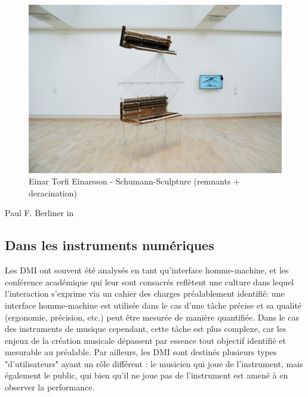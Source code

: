 \begin{figure}[!htbp]
	\includegraphics[width=\textwidth]{gfx/Einarson-SchumannSculpture}
	\caption{Einar Torfi Einarsson - Schumann-Sculpture (remnants + deracination)}
	\label{fig:gesture:einarsson}
\end{figure}


 Paul F. Berliner in \cite{berliner_thinking_2009}


\subsection*{Dans les instruments numériques}


Les DMI ont souvent été analysés en tant qu'interface homme-machine, et les conférence académique qui leur sont consacrés reflètent une culture dans lequel l'interaction s'exprime via un cahier des charges préalablement identifié: une interface homme-machine est utilisée dans le cas d'une tâche précise et sa qualité (ergonomie, précision, etc.) peut être mesurée de manière quantifiée.
Dans le cas des instruments de musique cependant, cette tâche est plus complexe, car les enjeux de la création musicale dépassent par essence tout objectif identifié et mesurable au préalable. Par ailleurs, les DMI sont destinés plusieurs types "d'utilisateurs" ayant un rôle différent : le musicien qui joue de l'instrument, mais également le public, qui bien qu'il ne joue pas de l'instrument est amené à en observer la performance.

